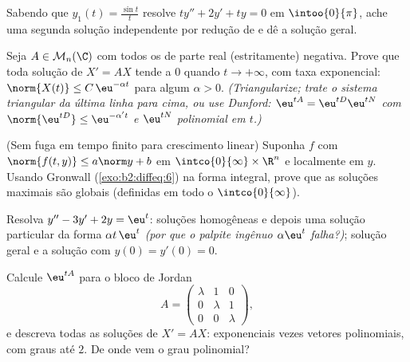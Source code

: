 \begin{exercise}[$\star\star$]\label{exo:b2:diffeq:7}
Sabendo que $y_1(t) = \frac{\sin t}{t}$ resolve $ty'' + 2y' + ty =
0$ em $\intoo{0}{\pi}$, ache uma segunda solução independente por
redução de  e dê a solução geral.
\end{exercise}

\begin{exercise}[$\star\star\star$]\label{exo:b2:diffeq:8}
Seja $A \in \mathcal{M}_n(\C)$ com todos os  de parte real
(estritamente) negativa. Prove que toda solução de $X' = AX$ tende a
$0$ quando $t \to +\infty$, com taxa exponencial: $\norm{X(t)}
\leq C\,\eu^{-\alpha t}$ para algum $\alpha > 0$.
\emph{(Triangularize; trate o sistema triangular da última linha
para cima, ou use Dunford: $\eu^{tA} = \eu^{tD}\eu^{tN}$ com
$\norm{\eu^{tD}} \leq \eu^{-\alpha' t}$ e $\eu^{tN}$ polinomial
em $t$.)}
\end{exercise}

\begin{exercise}[$\star\star\star$]\label{exo:b2:diffeq:9}
(Sem fuga em tempo finito para crescimento linear) Suponha $f$
 com $\norm{f(t, y)} \leq a\norm y + b$ em
$\intco{0}{\infty} \times \R^n$ e localmente  em $y$. Usando
Gronwall (\cref{exo:b2:diffeq:6}) na forma integral, prove que as
soluções maximais são globais (definidas em todo o
$\intco{0}{\infty}$).
\end{exercise}

\begin{exercise}[$\star$]\label{exo:b2:diffeq:10}
Resolva $y'' - 3y' + 2y = \eu^{t}$: soluções homogêneas e depois uma
solução particular da forma $\alpha t\,\eu^{t}$ \emph{(por que
o palpite ingênuo $\alpha\eu^t$ falha?)}; solução geral e
a solução com $y(0) = y'(0) = 0$.
\end{exercise}

\begin{exercise}[$\star\star$]\label{exo:b2:diffeq:11}
Calcule $\eu^{tA}$ para o bloco de Jordan
\[
A = \begin{pmatrix} \lambda & 1 & 0\\ 0 & \lambda & 1\\
0 & 0 & \lambda\end{pmatrix},
\]
e descreva todas as soluções de $X' = AX$: exponenciais vezes
vetores polinomiais, com graus até $2$. De onde vem o
grau polinomial?
\end{exercise}

